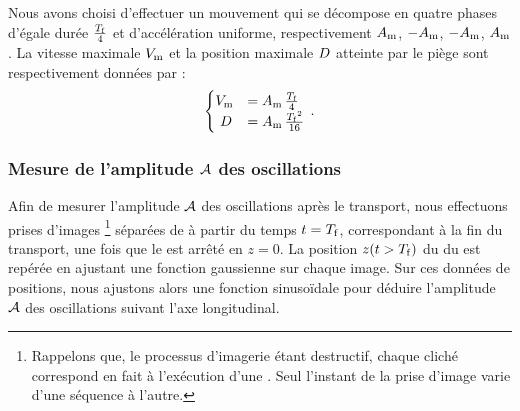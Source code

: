 Nous avons choisi d'effectuer un mouvement qui se décompose en quatre phases d'égale durée $\tfrac{{T_{\rm f}}}{4}$ et d'accélération uniforme, respectivement $A_{\rm m}$, $-A_{\rm m}$, $-A_{\rm m}$, $A_{\rm m}$.
La vitesse maximale ${V_{\rm m}}$ %
%
et la position maximale ${D}$ atteinte par le piège sont respectivement données par :
\[
\begin{cases}
	{V_{\rm m}}  & = A_{\rm m}\,\frac{{T_{\rm f}}}{4} \\
	~{D} & = A_{\rm m}\,\frac{{T_{\rm f}}^2}{16} \\
\end{cases}
\, .
\]
 
\subsubsection{Mesure de l'amplitude ${\mathcal{A}}$ des oscillations}
Afin de mesurer l'amplitude ${\mathcal{A}}$ des oscillations après le transport, nous effectuons  prises d'images%
\footnote{Rappelons que, le processus d'imagerie étant destructif, chaque cliché correspond en fait à l'exécution d'une \seqexp. Seul l'instant de la prise d'image varie d'une séquence à l'autre.
}
 séparées de  à partir du temps $t={T_{\rm f}}$, correspondant à la fin du transport, \cad une fois que le \pd est arrêté en $z=0$.
La position $z(t>{T_{\rm f}})$ du \cdm du \n est repérée en ajustant une fonction gaussienne \bde sur chaque image. 
Sur ces données de positions, nous ajustons alors une fonction sinusoïdale pour déduire l'amplitude ${\mathcal{A}}$ des oscillations suivant l'axe longitudinal. 

{\RemonteUneLigne\AjouteLigne}

